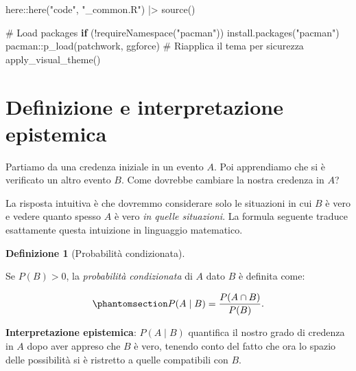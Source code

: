 \documentclass[
  italian,
  letterpaper,
  a4paper,
  11pt,
  open=any]{scrbook}
\newenvironment{Shaded}{\begin{snugshade}}{\end{snugshade}}
\newcommand{\CommentTok}[1]{\textcolor[rgb]{0.37,0.37,0.37}{#1}}
\newcommand{\ControlFlowTok}[1]{\textcolor[rgb]{0.00,0.23,0.31}{\textbf{#1}}}
\newcommand{\FunctionTok}[1]{\textcolor[rgb]{0.28,0.35,0.67}{#1}}
\newcommand{\NormalTok}[1]{\textcolor[rgb]{0.00,0.23,0.31}{#1}}
\newcommand{\SpecialCharTok}[1]{\textcolor[rgb]{0.37,0.37,0.37}{#1}}
\newcommand{\StringTok}[1]{\textcolor[rgb]{0.13,0.47,0.30}{#1}}
\theoremstyle{plain}
\theoremstyle{definition}
\theoremstyle{definition}
\newtheorem{definition}{Definizione}[chapter]
\theoremstyle{remark}
\begin{document}
\begin{tcolorbox}[enhanced jigsaw, arc=.35mm, bottomrule=.15mm, bottomtitle=1mm, breakable, colback=white, colbacktitle=quarto-callout-caution-color!10!white, colframe=quarto-callout-caution-color-frame, coltitle=black, left=2mm, leftrule=.75mm, opacityback=0, opacitybacktitle=0.6, rightrule=.15mm, title=\textcolor{quarto-callout-caution-color}{\faFire}\hspace{0.5em}{Preparazione del Notebook}, titlerule=0mm, toprule=.15mm, toptitle=1mm]

\begin{Shaded}
\begin{Highlighting}[]
\NormalTok{here}\SpecialCharTok{::}\FunctionTok{here}\NormalTok{(}\StringTok{"code"}\NormalTok{, }\StringTok{"\_common.R"}\NormalTok{) }\SpecialCharTok{|\textgreater{}} 
  \FunctionTok{source}\NormalTok{()}

\CommentTok{\# Load packages}
\ControlFlowTok{if}\NormalTok{ (}\SpecialCharTok{!}\FunctionTok{requireNamespace}\NormalTok{(}\StringTok{"pacman"}\NormalTok{)) }\FunctionTok{install.packages}\NormalTok{(}\StringTok{"pacman"}\NormalTok{)}
\NormalTok{pacman}\SpecialCharTok{::}\FunctionTok{p\_load}\NormalTok{(patchwork, ggforce)}
\CommentTok{\# Riapplica il tema per sicurezza}
\FunctionTok{apply\_visual\_theme}\NormalTok{()}
\end{Highlighting}
\end{Shaded}

\end{tcolorbox}

\section{Definizione e interpretazione
epistemica}\label{sec-conditional-definition}

Partiamo da una credenza iniziale in un evento \(A\). Poi apprendiamo
che si è verificato un altro evento \(B\). Come dovrebbe cambiare la
nostra credenza in \(A\)?

La risposta intuitiva è che dovremmo considerare solo le situazioni in
cui \(B\) è vero e vedere quanto spesso \(A\) è vero \emph{in quelle
situazioni}. La formula seguente traduce esattamente questa intuizione
in linguaggio matematico.

\begin{definition}[Probabilità
condizionata]\protect\hypertarget{def-conditional-probability}{}\label{def-conditional-probability}

Se \(P(B) > 0\), la \emph{probabilità condizionata} di \(A\) dato \(B\)
è definita come:

\begin{equation}\protect\phantomsection\label{eq-prob-cond-def}{
P(A \mid B) = \frac{P(A \cap B)}{P(B)}.
}\end{equation}

\textbf{Interpretazione epistemica}: \(P(A \mid B)\) quantifica il
nostro grado di credenza in \(A\) dopo aver appreso che \(B\) è vero,
tenendo conto del fatto che ora lo spazio delle possibilità si è
ristretto a quelle compatibili con \(B\).

\end{definition}
\end{document}
